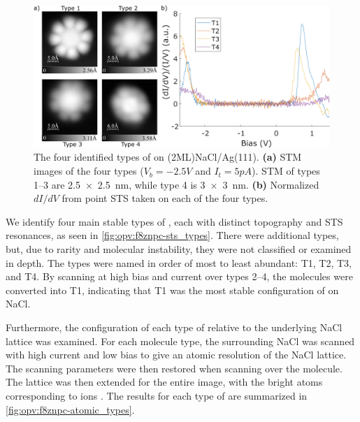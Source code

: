 


\begin{figure} [h]
    \centering
        \includegraphics[width=\textwidth]{pictures/4types_images.png}
    \caption{The four identified types of  on (2ML)NaCl/Ag(111). \textbf{(a)} STM images of the four types ($V_b = -2.5V$ and $I_t = 5pA$). STM of types 1--3 are \SI{2.5x2.5}{nm}, while type 4 is \SI{3x3}{nm}. \textbf{(b)} Normalized $dI/dV$ from point STS taken on each of the four types. }
    \label{fig:opv:f8znpc-sts_types}
\end{figure}

We identify four main stable types of , each with distinct topography and \ac{STS} resonances, as seen in \autoref{fig:opv:f8znpc-sts_types}. There were additional types, but, due to rarity and molecular instability, they were not classified or examined in depth. The types were named in order of most to least abundant: T1, T2, T3, and T4. By scanning at high bias and current over types 2--4, the molecules were converted into T1, indicating that T1 was the most stable configuration of  on NaCl. 

Furthermore, the configuration of each type of  relative to the underlying NaCl lattice was examined. For each molecule type, the surrounding NaCl was scanned with high current and low bias to give an atomic resolution of the NaCl lattice. The scanning parameters were then restored when scanning over the molecule. The lattice was then extended for the entire image, with the bright atoms corresponding to  ions \citep{heidorn2013influence}. The results for each type of  are summarized in \autoref{fig:opv:f8znpc-atomic_types}.

